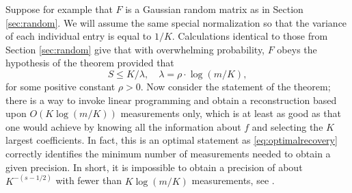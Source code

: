 \documentclass[11pt]{article}
\newcommand{\<}{\langle}
\renewcommand{\>}{\rangle}
\numberwithin{equation}{section}
\begin{document}
Suppose for example that $F$ is a Gaussian random matrix as in Section
\ref{sec:random}. We will assume the same special normalization so
that the variance of each individual entry is equal to $1/K$.
Calculations identical to those from Section \ref{sec:random} give
that with overwhelming probability, $F$ obeys the hypothesis of the
theorem provided that
\[
S \le K/\lambda, \quad \lambda = \rho \cdot \log(m/K), 
\]
for some positive constant $\rho > 0$. Now consider the statement of
the theorem; there is a way to invoke linear programming and obtain a
reconstruction based upon $O(K \log (m/K))$ measurements only, which
is at least as good as that one would achieve by knowing all the
information about $f$ and selecting the $K$ largest coefficients. In
fact, this is an optimal statement as \eqref{eq:optimalrecovery}
correctly identifies the minimum number of measurements needed to
obtain a given precision. In short, it is impossible to obtain a
precision of about $K^{-(s-1/2)}$ with fewer than $K \log (m/K)$
measurements, see \cite{OptimalRecovery,CompressedSensing}.
\end{document}
